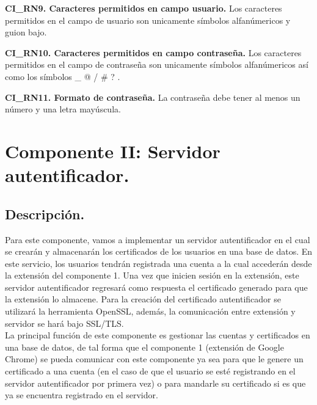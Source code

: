 \documentclass[12pt, a4paper, titlepage]{report}
\begin{document}
			\textbf{CI\_RN9. Caracteres permitidos en campo usuario.} Los caracteres permitidos en el campo de usuario son unicamente símbolos alfanúmericos y guion bajo.\\
			\label{CI_RN9}
			
			\textbf{CI\_RN10. Caracteres permitidos en campo contraseña.} Los caracteres permitidos en el campo de contraseña son unicamente símbolos alfanúmericos así como los s\'imbolos \_ @ / \# ? .\\
			\label{CI_RN10}
			
			\textbf{CI\_RN11. Formato de contraseña.} La contraseña debe tener al menos un número y una letra mayúscula.\\
			\label{CI_RN11}
				
	        
	   \section{Componente II: Servidor autentificador.}
	        \subsection{Descripción.}
	        Para este componente, vamos a implementar un servidor autentificador en el cual se crearán y almacenarán los certificados de los usuarios en una base de datos. En este servicio, los usuarios tendrán registrada una cuenta a la cual accederán desde la extensión del componente 1. Una vez que inicien sesión en la extensión, este servidor autentificador regresará como respuesta el certificado generado para que la extensión lo almacene. Para la creación del certificado autentificador se utilizará la herramienta OpenSSL, además, la comunicación entre extensión y servidor se hará bajo SSL/TLS.\\
	        
	        La principal función de este componente es gestionar las cuentas y certificados en una base de datos, de tal forma que el componente 1 (extensión de Google Chrome) se pueda comunicar con este componente ya sea para que le genere un certificado a una cuenta (en el caso de que el usuario se esté registrando en el servidor autentificador por primera vez) o para mandarle su certificado si es que ya se encuentra registrado en el servidor.\\
	        
\end{document}
